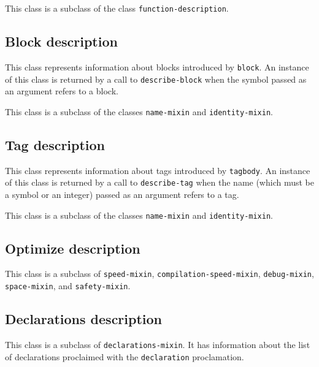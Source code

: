 This class is a subclass of the class \texttt{function-description}.

\subsection{Block description}
\label{sec-instantiable-classes-block-description}

{\footnotesize
{}
}

This class represents information about blocks introduced by
\texttt{block}.  An instance of this class is returned by a call to
\texttt{describe-block} when the symbol passed as an argument refers to a
block.

This class is a subclass of the classes \texttt{name-mixin} and
\texttt{identity-mixin}.

\subsection{Tag description}
\label{sec-instantiable-classes-tag-description}

{\footnotesize
{}
}

This class represents information about tags introduced by
\texttt{tagbody}.  An instance of this class is returned by a call to
\texttt{describe-tag} when the name (which must be a symbol or an integer)
passed as an argument refers to a tag.

This class is a subclass of the classes \texttt{name-mixin} and
\texttt{identity-mixin}.

\subsection{Optimize description}
\label{sec-instantiable-classes-optimize-description}

{\footnotesize
{}
}

This class is a subclass of \texttt{speed-mixin},
\texttt{compilation-speed-mixin}, \texttt{debug-mixin},
\texttt{space-mixin}, and \texttt{safety-mixin}.

\subsection{Declarations description}
\label{sec-instantiable-classes-declarations-description}

{\footnotesize
{}
}

This class is a subclass of \texttt{declarations-mixin}.
It has information about the list of declarations proclaimed
with the \texttt{declaration} proclamation.
